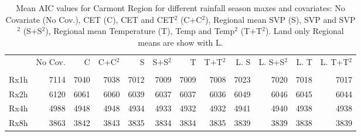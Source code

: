 \begin{table}[ht!]
\caption{Mean AIC values for Carmont Region for different rainfall season maxes and covariates: 
            No Covariate (No Cov.), CET (C), CET and CET$^2$ (C+C$^2$), 
            Regional mean SVP (S), SVP and SVP$^2$ (S+S$^2$), Regional mean Temperature (T), Temp and Temp$^2$ (T+T$^2$).
            Land only Regional means are show with L.}
\label{tab:aic}
\begin{tabular}{lrrrrrrrrrrr}
\toprule
 & No Cov. & C & C+C$^2$ & S & S+S$^2$ & T & T+T$^2$ & L. S & L. S+S$^2$ & L. T & L. T+T$^2$ \\
 &  &  &  &  &  &  &  &  &  &  &  \\
\midrule
Rx1h & 7114 & 7040 & 7038 & 7012 & 7009 & 7009 & 7008 & 7023 & 7020 & 7018 & 7017 \\
Rx2h & 6120 & 6061 & 6060 & 6039 & 6037 & 6037 & 6036 & 6049 & 6046 & 6045 & 6044 \\
Rx4h & 4988 & 4948 & 4948 & 4934 & 4933 & 4932 & 4932 & 4941 & 4940 & 4938 & 4938 \\
Rx8h & 3863 & 3842 & 3843 & 3835 & 3834 & 3834 & 3835 & 3839 & 3839 & 3838 & 3839 \\
\bottomrule
\end{tabular}
\end{table}
